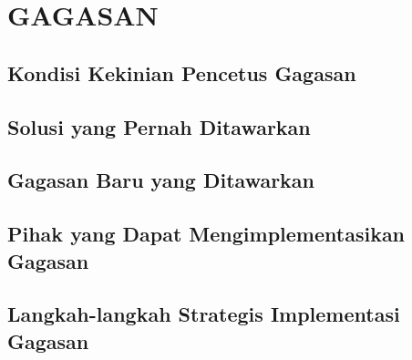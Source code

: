 \section{GAGASAN}
\subsection{Kondisi Kekinian Pencetus Gagasan}

\subsection{Solusi yang Pernah Ditawarkan}

\subsection{Gagasan Baru yang Ditawarkan}

\subsection{Pihak yang Dapat Mengimplementasikan Gagasan}

\subsection{Langkah-langkah Strategis Implementasi Gagasan}

\newpage